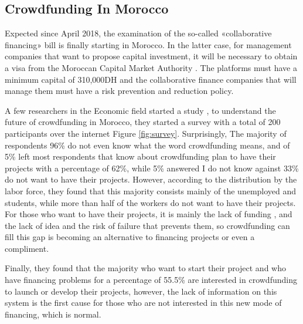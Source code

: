 \subsection*{ Crowdfunding In Morocco }
Expected since April 2018, the examination of the so-called «collaborative financing» bill is finally starting in Morocco. In the latter case, for management companies that want to propose capital investment, it will be necessary to obtain a visa from the Moroccan Capital Market Authority . The platforms must have a minimum capital of 310,000DH and the collaborative finance companies that will manage them must have a risk prevention and reduction policy.

A few researchers in the Economic field started a study \cite{crowdMorocco}, to understand the future of crowdfunding in Morocco, they started a survey with a total of 200 participants over the internet Figure \ref{fig:survey}. Surprisingly,  The majority of respondents 96\% do not even know what the word crowdfunding means, and of 5\% left most respondents that know about crowdfunding plan to have their projects with a percentage of 62\%, while 5\% answered I do not know against 33\% do not want to have their projects. However, according to the distribution by the labor force, they found that this majority consists mainly of the unemployed and students, while more than half of the workers do not want to have their projects. For those who want to have their projects, it is mainly the lack of funding , and the lack of idea and the risk of failure that prevents them, so crowdfunding can fill this gap is becoming an alternative to financing projects or even a compliment.

Finally, they found that the majority who want to start their project and who have financing problems for a percentage of 55.5\% are interested in crowdfunding to launch or develop their projects, however, the lack of information on this system is the first cause for those who are not interested in this new mode of financing, which is normal.




   
   
